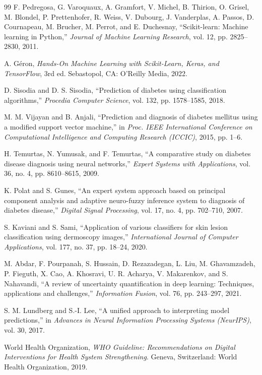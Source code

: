 \documentclass[12pt,a4paper]{report}
\begin{document}
\begin{thebibliography}{99}
F. Pedregosa, G. Varoquaux, A. Gramfort, V. Michel, B. Thirion, O. Grisel, M. Blondel, P. Prettenhofer, R. Weiss, V. Dubourg, J. Vanderplas, A. Passos, D. Cournapeau, M. Brucher, M. Perrot, and E. Duchesnay, ``Scikit-learn: Machine learning in Python,'' \emph{Journal of Machine Learning Research}, vol. 12, pp. 2825--2830, 2011.

A. G\'{e}ron, \emph{Hands-On Machine Learning with Scikit-Learn, Keras, and TensorFlow}, 3rd ed. Sebastopol, CA: O'Reilly Media, 2022.

D. Sisodia and D. S. Sisodia, ``Prediction of diabetes using classification algorithms,'' \emph{Procedia Computer Science}, vol. 132, pp. 1578--1585, 2018.

M. M. Vijayan and B. Anjali, ``Prediction and diagnosis of diabetes mellitus using a modified support vector machine,'' in \emph{Proc. IEEE International Conference on Computational Intelligence and Computing Research (ICCIC)}, 2015, pp. 1--6.

H. Temurtas, N. Yumusak, and F. Temurtas, ``A comparative study on diabetes disease diagnosis using neural networks,'' \emph{Expert Systems with Applications}, vol. 36, no. 4, pp. 8610--8615, 2009.

K. Polat and S. Gunes, ``An expert system approach based on principal component analysis and adaptive neuro-fuzzy inference system to diagnosis of diabetes disease,'' \emph{Digital Signal Processing}, vol. 17, no. 4, pp. 702--710, 2007.

S. Kaviani and S. Sami, ``Application of various classifiers for skin lesion classification using dermoscopy images,'' \emph{International Journal of Computer Applications}, vol. 177, no. 37, pp. 18--24, 2020.

M. Abdar, F. Pourpanah, S. Hussain, D. Rezazadegan, L. Liu, M. Ghavamzadeh, P. Fieguth, X. Cao, A. Khosravi, U. R. Acharya, V. Makarenkov, and S. Nahavandi, ``A review of uncertainty quantification in deep learning: Techniques, applications and challenges,'' \emph{Information Fusion}, vol. 76, pp. 243--297, 2021.

S. M. Lundberg and S.-I. Lee, ``A unified approach to interpreting model predictions,'' in \emph{Advances in Neural Information Processing Systems (NeurIPS)}, vol. 30, 2017.

World Health Organization, \emph{WHO Guideline: Recommendations on Digital Interventions for Health System Strengthening}. Geneva, Switzerland: World Health Organization, 2019.


\end{thebibliography}
\end{document}
